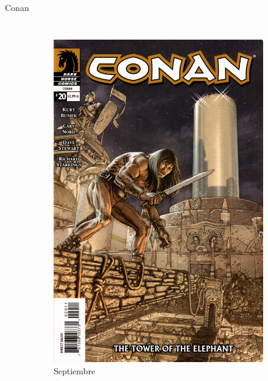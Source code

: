 \begin{frame}{Conan}
\begin{columns}
\begin{figure}[htp]
 \centering
 \begin{subfigure}[b]{0.3\textwidth}
   \includegraphics[width=\textwidth]{img/DarkHorse20Portada}
   \caption{Septiembre}
 \end{subfigure}
~
 \begin{subfigure}[b]{0.3\textwidth}

\end{subfigure}
\end{figure}
\end{columns}
\end{frame}
